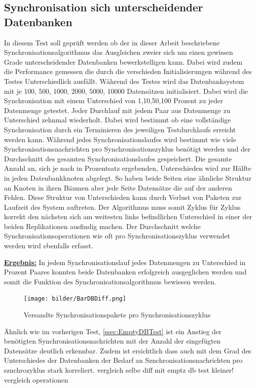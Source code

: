 \documentclass[a4paper,11pt,oneside,%
headsepline,												%
footsepline,												%
bibtotocnumbered									%
]{scrreprt}
\begin{document}
\subsection{Synchronisation sich unterscheidender Datenbanken}
\label{ssec:DiffThroughLost}
In diesem Test soll geprüft werden ob der in dieser Arbeit beschriebene Synchronisationsalgorithmus das Ausgleichen zweier sich um einen gewissen Grade unterscheidender Datenbanken bewerkstelligen kann. Dabei wird zudem die Performance gemessen die durch die verschieden Initialisierungen während des Testes Unterschiedlich ausfällt. Während des Testes wird das Datenbanksystem mit je 100, 500, 1000, 2000, 5000, 10000 Datensätzen initialisiert. Dabei wird die Synchronisation mit einem Unterschied von 1,10,50,100 Prozent zu jeder Datenmenge getestet. Jeder Durchlauf mit jedem Paar aus Datenmenge zu Unterschied zehnmal wiederholt. Dabei wird bestimmt ob eine vollständige Synchronisation durch ein Terminieren des jeweiligen Testdurchlaufs erreicht werden kann. Während jedes Synchronisationslaufes wird bestimmt wie viele Synchronisationsnachrichten pro Synchronisationszyklus benötigt werden und der Durchschnitt des gesamten Synchronisationslaufes gespeichert. Die gesamte Anzahl an, sich je nach in Prozentsatz ergebenden, Unterschieden wird zur Hälfte in jeden Datenbankknoten abgelegt. So haben beide Seiten eine ähnliche Struktur an Knoten in ihren Bäumen aber jede Seite Datensätze die auf der anderen Fehlen. Diese Struktur von Unterschieden kann durch Verlust von Paketen zur Laufzeit des System auftreten. Der Algorithmus muss somit Zyklus für Zyklus korrekt den nächsten sich am weitesten links befindlichen Unterschied in einer der beiden Replikationen ausfindig machen. Der Durchschnitt welche Synchronisationsoperationen wie oft pro Synchronisationszyklus verwendet werden wird ebenfalls erfasst.

\underline{{\bf Ergebnis:}} In jedem Synchronisationslauf jedes Datenmengen zu Unterschied in Prozent Paares konnten beide Datenbanken erfolgreich ausgeglichen werden und somit die Funktion des Synchronisationsalgorithmus bewiesen werden.
\begin{figure}
  \begin{center}
    \texttt{[image: bilder/BarDBDiff.png]}
  \end{center}
 \caption{Versandte Synchronisationspakete pro Synchronisationszyklus}
  \label{fig:EmptyDBTraffic}
\end{figure}
 Ähnlich wie im vorherigen Test, \autoref{ssec:EmptyDBTest} ist ein Anstieg der benötigten Synchronisationsnachrichten mit der Anzahl der eingefügten Datensätze deutlich erkennbar. Zudem ist ersichtlich dass auch mit dem Grad des Unterschiedes der Datenbanken der Bedarf an Sznchronisationsnachrichten pro sznchrozyklus stark korreliert. vergleich selbe diff mit emptz db test kleiner!
 vergleich operationen
\end{document}
